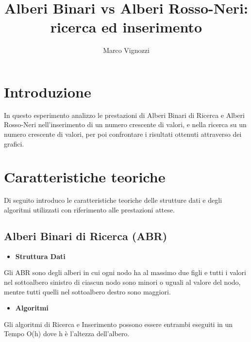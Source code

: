 \documentclass{article}
\title{Alberi Binari vs Alberi Rosso-Neri: ricerca ed inserimento}
\author{Marco Vignozzi}
\begin{document}
\maketitle

\section{Introduzione}
In questo esperimento analizzo le prestazioni di Alberi Binari di Ricerca e Alberi Rosso-Neri nell'inserimento di un numero crescente di valori, e nella ricerca su un numero crescente di valori, per poi confrontare i risultati ottenuti attraverso dei grafici.

\section{Caratteristiche teoriche}
Di seguito introduco le caratteristiche teoriche delle strutture dati e degli algoritmi utilizzati con riferimento alle prestazioni attese.

\subsection{Alberi Binari di Ricerca (ABR)}
\begin{itemize}
    \item \textbf{Struttura Dati}
\end{itemize}
Gli ABR sono degli alberi in cui ogni nodo ha al massimo due figli e tutti i valori nel sottoalbero sinistro di ciascun nodo sono minori o uguali al valore del nodo, mentre tutti quelli nel sottoalbero destro sono maggiori.
\begin{itemize}
    \item \textbf{Algoritmi}
\end{itemize}
Gli algoritmi di Ricerca e Inserimento possono essere entrambi eseguiti in un Tempo O(h) dove h è l'altezza dell'albero.
\end{document}

